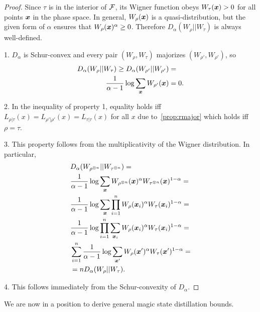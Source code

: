 \documentclass[pra,
aps,
twocolumn,
superscriptaddress,
groupedaddress,
nofootinbib,
reprint
]{revtex4-1}
\begin{document}
\begin{proof}
	Since $\tau$ is in the interior of ${\mathcal F}$, its Wigner function obeys $W_\tau(\boldsymbol{x}) >0$ for all points $\boldsymbol{x}$ in the phase space. 
In general, $W_\rho(\boldsymbol{x})$ is a quasi-distribution, but the given form of $\alpha$ ensures that $W_{\rho}(\bm{x})^\alpha \geq 0$. 
Therefore $D_\alpha (W_\rho || W_\tau)$ is always well-defined.

1. $D_\alpha$ is Schur-convex and every pair $(W_{\rho}, W_{\tau})$ majorizes $(W_{\rho'}, W_{\rho'})$, so
\begin{align}
	D_\alpha(W_{\rho} || W_{\tau}) \geq D_\alpha(W_{\rho'} || W_{\rho'}) &= \nonumber\\
	\frac{1}{\alpha-1} \log \sum_{\bm{x}} W_{\rho'}(\bm{x}) &= 0.
\end{align}

2. In the inequality of property 1, equality holds iff $L_{\rho|\tau}(x) = L_{\rho'|\rho'}(x) = L_{\tau|\tau}(x)$ for all $x$ due to~\cref{prop:rmajor} which holds iff $\rho = \tau$.

3. This property follows from the multiplicativity of the Wigner distribution.
In particular,
\begin{align}
	&D_\alpha(W_{\rho^{\otimes n}} || W_{\tau^{\otimes n}}) = \nonumber\\
	&\frac{1}{\alpha - 1} \log \sum_{\bm{x}} W_{\rho^{\otimes n}}(\bm{x})^\alpha W_{\tau^{\otimes n}}(\bm{x})^{1-\alpha} = \nonumber\\
	&\frac{1}{\alpha - 1} \log \sum_{\bm{x}} \prod_{i=1}^n W_{\rho}(\bm{x}_i)^\alpha W_{\tau}(\bm{x}_i)^{1-\alpha} = \nonumber\\
	&\frac{1}{\alpha - 1} \log \prod_{i=1}^n \sum_{\bm{x}_i} W_{\rho}(\bm{x}_i)^\alpha W_{\tau}(\bm{x}_i)^{1-\alpha} = \nonumber\\
	&\sum_{i=1}^n \frac{1}{\alpha - 1} \log \sum_{\bm{x}'} W_{\rho}(\bm{x}')^\alpha W_{\tau}(\bm{x}')^{1-\alpha} = \nonumber\\
	&= n D_{\alpha}(W_\rho || W_\tau).
\end{align}

4. This follows immediately from the Schur-convexity of $D_\alpha$.
\end{proof}

We are now in a position to derive general magic state distillation bounds.
\end{document}
